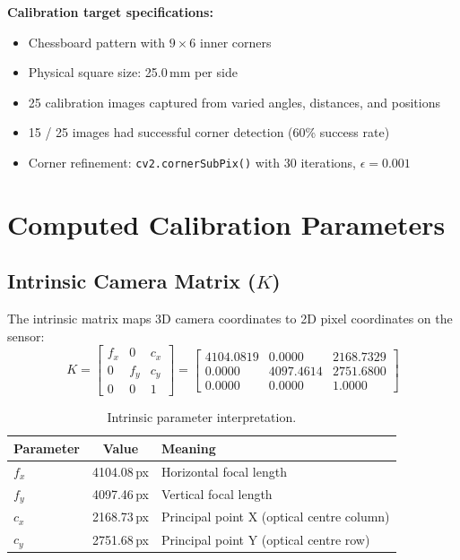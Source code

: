 \documentclass[12pt, a4paper, twoside]{report}
\begin{document}
\noindent\textbf{Calibration target specifications:}
\begin{itemize}
    \item Chessboard pattern with $9 \times 6$ inner corners
    \item Physical square size: 25.0\,mm per side
    \item 25 calibration images captured from varied angles, distances, and positions
    \item 15 / 25 images had successful corner detection (60\% success rate)
    \item Corner refinement: \texttt{cv2.cornerSubPix()} with 30 iterations, $\epsilon = 0.001$
\end{itemize}

\section{Computed Calibration Parameters}

\subsection{Intrinsic Camera Matrix ($K$)}
The intrinsic matrix maps 3D camera coordinates to 2D pixel coordinates on the sensor:
\begin{equation}
\label{eq:camera-matrix}
K = \begin{bmatrix} f_x & 0 & c_x \\ 0 & f_y & c_y \\ 0 & 0 & 1 \end{bmatrix}
= \begin{bmatrix} 4104.0819 & 0.0000 & 2168.7329 \\ 0.0000 & 4097.4614 & 2751.6800 \\ 0.0000 & 0.0000 & 1.0000 \end{bmatrix}
\end{equation}

\begin{table}[H]
\centering
\caption{Intrinsic parameter interpretation.}
\label{tab:intrinsics}
\begin{tabular}{lcl}
\toprule
\textbf{Parameter} & \textbf{Value} & \textbf{Meaning} \\
\midrule
$f_x$ & 4104.08\,px & Horizontal focal length \\
$f_y$ & 4097.46\,px & Vertical focal length \\
$c_x$ & 2168.73\,px & Principal point X (optical centre column) \\
$c_y$ & 2751.68\,px & Principal point Y (optical centre row) \\
\bottomrule
\end{tabular}
\end{table}
\end{document}
